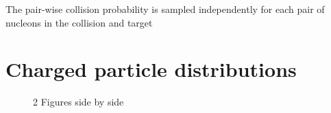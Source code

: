 \documentclass[aps,prl,reprint,amsmath,nofootinbib]{revtex4-1}
\begin{document}
The pair-wise collision probability is sampled independently for each pair of nucleons in the collision and target

\section{Charged particle distributions}

\begin{figure*}
    \centering
    \caption{2 Figures side by side}
    \label{fig:example}
\end{figure*}


\end{document}

